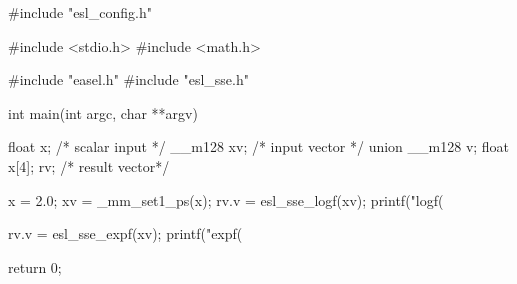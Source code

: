 \begin{cchunk}
#include "esl_config.h"

#include <stdio.h>
#include <math.h>

#include "easel.h"
#include "esl_sse.h"

int
main(int argc, char **argv)
{
  float    x;                           /* scalar input */
  __m128   xv;                          /* input vector */
  union { __m128 v; float x[4]; } rv;   /* result vector*/

  x    = 2.0;
  xv   = _mm_set1_ps(x);
  rv.v = esl_sse_logf(xv);
  printf("logf(%
  
  rv.v = esl_sse_expf(xv);
  printf("expf(%

  return 0;
}
\end{cchunk}
